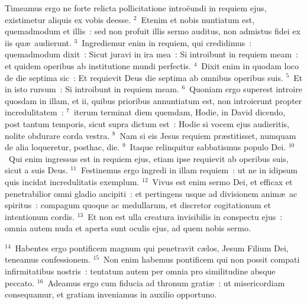 \lettrine[lines=3,image=true,loversize=0.05,lraise=-0.03]{T}{}imeamus ergo ne forte relicta pollicitatione intro\"eundi in requiem ejus, existimetur aliquis ex vobis deesse.
${}^{2}$~Etenim et nobis nuntiatum est, quemadmodum et illis~: sed non profuit illis sermo auditus, non admistus fidei ex iis qu\ae\ audierunt.
${}^{3}$~Ingrediemur enim in requiem, qui credidimus~: quemadmodum dixit~: Sicut juravi in ira mea~: Si introibunt in requiem meam~: et quidem operibus ab institutione mundi perfectis.
${}^{4}$~Dixit enim in quodam loco de die septima sic~: Et requievit Deus die septima ab omnibus operibus suis.
${}^{5}$~Et in isto rursum~: Si introibunt in requiem meam.
${}^{6}$~Quoniam ergo superest introire quosdam in illam, et ii, quibus prioribus annuntiatum est, non introierunt propter incredulitatem~:
${}^{7}$~iterum terminat diem quemdam, Hodie, in David dicendo, post tantum temporis, sicut supra dictum est~: Hodie si vocem ejus audieritis, nolite obdurare corda vestra.
${}^{8}$~Nam si eis Jesus requiem pr\ae stitisset, numquam de alia loqueretur, posthac, die.
${}^{9}$~Itaque relinquitur sabbatismus populo Dei.
${}^{10}$~Qui enim ingressus est in requiem ejus, etiam ipse requievit ab operibus suis, sicut a suis Deus.
${}^{11}$~Festinemus ergo ingredi in illam requiem~: ut ne in idipsum quis incidat incredulitatis exemplum.
${}^{12}$~Vivus est enim sermo Dei, et efficax et penetrabilior omni gladio ancipiti~: et pertingens usque ad divisionem anim\ae\ ac spiritus~: compagum quoque ac medullarum, et discretor cogitationum et intentionum cordis.
${}^{13}$~Et non est ulla creatura invisibilis in conspectu ejus~: omnia autem nuda et aperta sunt oculis ejus, ad quem nobis sermo.


${}^{14}$~Habentes ergo pontificem magnum qui penetravit c\ae los, Jesum Filium Dei, teneamus confessionem.
${}^{15}$~Non enim habemus pontificem qui non possit compati infirmitatibus nostris~: tentatum autem per omnia pro similitudine absque peccato.
${}^{16}$~Adeamus ergo cum fiducia ad thronum grati\ae~: ut misericordiam consequamur, et gratiam inveniamus in auxilio opportuno.

